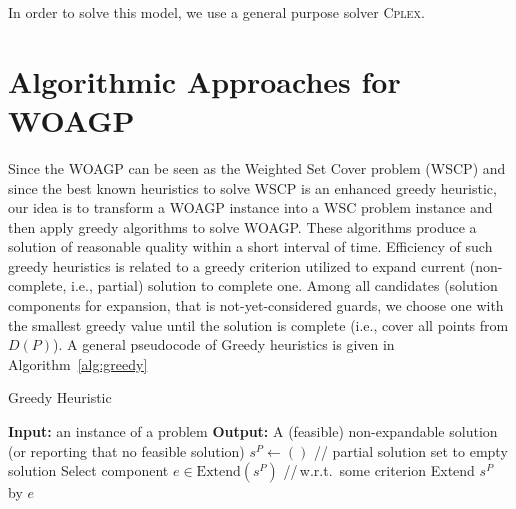 \documentclass[runningheads,a4paper]{llncs}
\begin{document}
      In order to solve this model, we use a general purpose solver \textsc{Cplex}.
     \section{Algorithmic Approaches for WOAGP}
          Since the WOAGP can be seen as the Weighted Set Cover problem (WSCP) and since the best known heuristics to solve WSCP is an enhanced greedy heuristic, our idea is to transform a WOAGP instance into a WSC problem instance and then
          apply greedy algorithms to solve WOAGP. These algorithms produce a solution of reasonable quality within a short interval of time. Efficiency of such greedy heuristics is related to a greedy criterion utilized to expand current (non-complete, i.e., partial) solution to complete one. Among all candidates (solution components for expansion, that is not-yet-considered guards, we choose one with the smallest greedy value until the solution is complete (i.e., cover all  points from $D(P)$).
          A general pseudocode of Greedy heuristics is given in Algorithm~\ref{alg:greedy}

          \begin{algorithm}[!t]
          	\caption{Greedy Heuristic}\label{alg:greedy}
          	\begin{algorithmic}[1]
          		\State \textbf{Input:} an instance of a problem
          		\State \textbf{Output:} A (feasible) non-expandable solution (or reporting that no feasible solution)
          		\State $s^{P} \gets ()$ \hspace{0.3cm}// partial solution set to empty solution
          		\State Select component $e \in  \text{Extend}(s^{P})$ \hspace{0.3cm}//\,w.r.t.\  some criterion
          		\State Extend $s^{P}$ by $e$
          		\EndWhile
          	\end{algorithmic}
          \end{algorithm}
\end{document}

